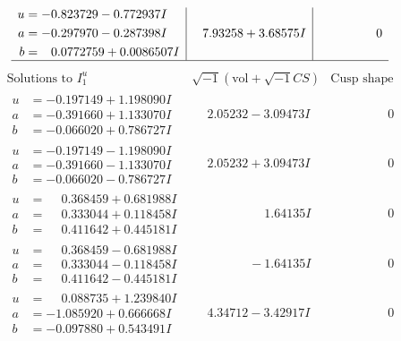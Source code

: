 \documentclass[1p]{elsarticle_modified}
\theoremstyle{definition}
\newcommand{\I}{\sqrt{-1}}
\begin{document}
$$\begin{array}{c|c|c}
\begin{aligned}
u &= -0.823729 - 0.772937 I \\
a &= -0.297970 - 0.287398 I \\
b &= \phantom{-}0.0772759 + 0.0086507 I\end{aligned}
 & \phantom{-}7.93258 + 3.68575 I & \phantom{-0.000000 } 0\\
 \hline 
 \end{array}$$\newpage$$\begin{array}{c|c|c}  
\text{Solutions to }I^u_{1}& \I (\text{vol} + \sqrt{-1}CS) & \text{Cusp shape}\\
 \hline 
\begin{aligned}
u &= -0.197149 + 1.198090 I \\
a &= -0.391660 + 1.133070 I \\
b &= -0.066020 + 0.786727 I\end{aligned}
 & \phantom{-}2.05232 - 3.09473 I & \phantom{-0.000000 } 0 \\ \hline\begin{aligned}
u &= -0.197149 - 1.198090 I \\
a &= -0.391660 - 1.133070 I \\
b &= -0.066020 - 0.786727 I\end{aligned}
 & \phantom{-}2.05232 + 3.09473 I & \phantom{-0.000000 } 0 \\ \hline\begin{aligned}
u &= \phantom{-}0.368459 + 0.681988 I \\
a &= \phantom{-}0.333044 + 0.118458 I \\
b &= \phantom{-}0.411642 + 0.445181 I\end{aligned}
 & \phantom{-0.000000 -}1.64135 I & \phantom{-0.000000 } 0 \\ \hline\begin{aligned}
u &= \phantom{-}0.368459 - 0.681988 I \\
a &= \phantom{-}0.333044 - 0.118458 I \\
b &= \phantom{-}0.411642 - 0.445181 I\end{aligned}
 & \phantom{-0.000000 } -1.64135 I & \phantom{-0.000000 } 0 \\ \hline\begin{aligned}
u &= \phantom{-}0.088735 + 1.239840 I \\
a &= -1.085920 + 0.666668 I \\
b &= -0.097880 + 0.543491 I\end{aligned}
 & \phantom{-}4.34712 - 3.42917 I & \phantom{-0.000000 } 0 \\ \hline\begin{aligned}

\end{aligned}
\end{array}$$
\end{document}
